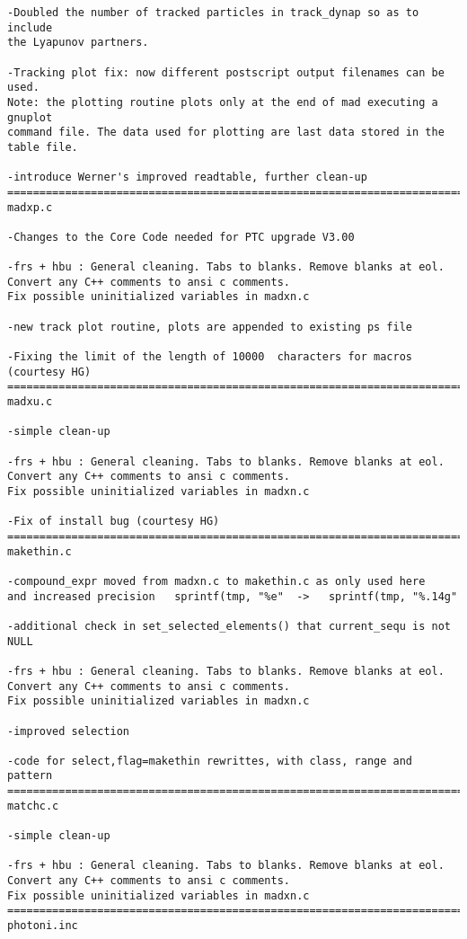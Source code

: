 \begin{verbatim}
-Doubled the number of tracked particles in track_dynap so as to include 
the Lyapunov partners.

-Tracking plot fix: now different postscript output filenames can be used. 
Note: the plotting routine plots only at the end of mad executing a gnuplot 
command file. The data used for plotting are last data stored in the table file.

-introduce Werner's improved readtable, further clean-up
=============================================================================
madxp.c

-Changes to the Core Code needed for PTC upgrade V3.00

-frs + hbu : General cleaning. Tabs to blanks. Remove blanks at eol.
Convert any C++ comments to ansi c comments.
Fix possible uninitialized variables in madxn.c

-new track plot routine, plots are appended to existing ps file

-Fixing the limit of the length of 10000  characters for macros (courtesy HG)
=============================================================================
madxu.c

-simple clean-up

-frs + hbu : General cleaning. Tabs to blanks. Remove blanks at eol.
Convert any C++ comments to ansi c comments.
Fix possible uninitialized variables in madxn.c

-Fix of install bug (courtesy HG)
=============================================================================
makethin.c

-compound_expr moved from madxn.c to makethin.c as only used here
and increased precision   sprintf(tmp, "%e"  ->   sprintf(tmp, "%.14g"

-additional check in set_selected_elements() that current_sequ is not NULL

-frs + hbu : General cleaning. Tabs to blanks. Remove blanks at eol.
Convert any C++ comments to ansi c comments.
Fix possible uninitialized variables in madxn.c

-improved selection

-code for select,flag=makethin rewrittes, with class, range and pattern
=============================================================================
matchc.c

-simple clean-up

-frs + hbu : General cleaning. Tabs to blanks. Remove blanks at eol.
Convert any C++ comments to ansi c comments.
Fix possible uninitialized variables in madxn.c
=============================================================================
photoni.inc


\end{verbatim}
